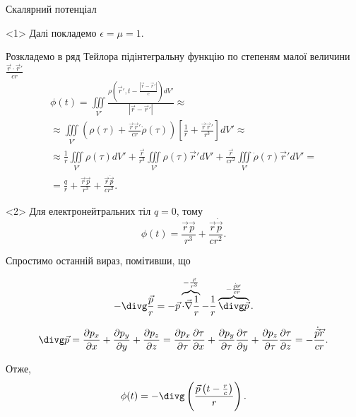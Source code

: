 \documentclass[9pt]{beamer}
\let\vect\vec
\begin{document}
\begin{frame}{Скалярний потенціал}{}
	\begin{onlyenv}
		Далі покладемо $ \epsilon = \mu = 1 $.

		Розкладемо  в ряд Тейлора підінтегральну функцію  по степеням малої величини $  \frac{\vect{r} \cdot \vect{r}'}{cr} $
		\begin{multline*}
			\phi(t) = \iiint\limits_{V'}\frac{\rho\left(\vect{r}', t - \frac{|\vect{r} - \vect{r}'|}{c}\right)  dV'}{|\vect{r} - \vect{r}'|} \approx \\ \approx
			\iiint\limits_{V'} \left( \rho(\tau) +  \frac{\vect{r} \vect{r}'}{cr} \dot{\rho}(\tau)\right) \left[ \frac1{r} + \frac{\vect{r}  \vect{r}'}{r^3} \right]dV' \approx \\
			\approx \frac1r\iiint\limits_{V'} {\rho(\tau)} dV' + \frac{\vect{r}  }{r^3}\iiint\limits_{V'}\rho(\tau)\vect{r}' dV' + \frac{\vect{r} }{cr^2}\iiint\limits_{V'} \dot{\rho}(\tau) \vect{r}'dV' = \\
			= \frac{q}{r} + \frac{\vect{r}\vect{p}}{r^3} + \frac{\vect{r}\dot{\vect{p}}}{cr^2}.
		\end{multline*}
	\end{onlyenv}
	\begin{onlyenv}
		Для електронейтральних тіл $ q = 0 $, тому
		\begin{equation*}
			\phi(t)  = \frac{\vect{r}\vect{p}}{r^3} + \frac{\vect{r}\dot{\vect{p}}}{cr^2}.
		\end{equation*}

		Спростимо останній вираз, помітивши, що

		\begin{equation*}
			-\divg\frac{\vect{p}}{r} = -\vect{p}\overbrace{\cdot\vect{\nabla}\frac1r}^{-\frac{\vect{r}}{r^3}} - \frac1r\overbrace{\divg\vect{p}}^{-\frac{\dot{\vect{p}}\vect{r}}{cr}}.
		\end{equation*}

		\begin{equation*}
			\divg\vect{p} = \frac{\partial p_x}{\partial x} + \frac{\partial p_y}{\partial y} + \frac{\partial p_z}{\partial z} = \frac{\partial p_x}{\partial \tau}\frac{\partial\tau}{\partial x} + \frac{\partial p_y}{\partial \tau}\frac{\partial\tau}{\partial y} +\frac{\partial p_z}{\partial \tau}\frac{\partial\tau}{\partial z} = -\frac{\dot{\vect{p}}\vect{r}}{cr}.
		\end{equation*}

		Отже,
		\begin{equation*}
			\phi(t) = -\divg\left( \frac{\vect{p}\left(t - \frac{r}{c}\right)}{r} \right).
		\end{equation*}
	\end{onlyenv}
\end{frame}
\end{document}
